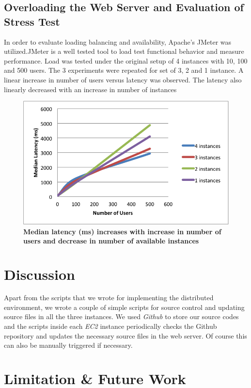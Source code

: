 \documentclass[12pt, twocolumn]{article}
\begin{document}
\subsection{Overloading the Web Server and Evaluation of Stress Test}
In order to evaluate loading balancing and availability, Apache's JMeter was utilized.JMeter is a well tested tool to load test functional behavior and measure performance\cite{apache}. Load was tested under the original setup of 4 instances with 10, 100 and 500 users. The 3 experiments were repeated for set of 3, 2 and 1 instance. A linear increase in number of users versus latency was observed. The latency also linearly decreased with an increase in number of instances 
\begin{figure}[H]
  \centering
      \includegraphics[scale=0.45]{Images/median_latency.png}
  \caption{\textbf{Median latency (ms) increases with increase in number of users and decrease in number of available instances} }
\label{fig:consistency}
\end{figure}
\section{Discussion}
Apart from the scripts that we wrote for implementing the distributed environment, we wrote a couple of simple scripts for source control and updating source files in all the three instances. We used \emph{Github} \cite{github} to store our source codes and the scripts inside each \emph{EC2} instance periodically checks the {Github} repository and updates the necessary source files in the web server. Of course this can also be manually triggered if necessary.

\section{Limitation \& Future Work}
\end{document}
